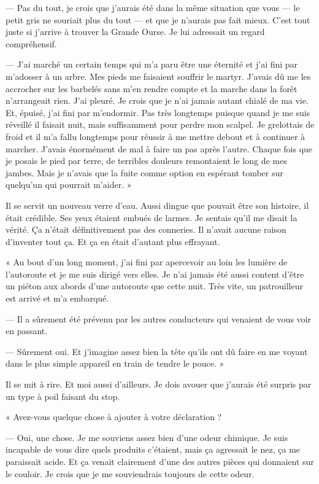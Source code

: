 — Pas du tout, je crois que j'aurais été dans la même situation que vous — le petit gris ne souriait plus du tout — et
que je n'aurais pas fait mieux. C'est tout juste si j'arrive à trouver la Grande Ourse. Je lui adressait un regard
compréhensif.

— J'ai marché un certain temps qui m'a paru être une éternité et j'ai fini par m'adosser à un arbre. Mes pieds me
faisaient souffrir le martyr. J'avais dû me les accrocher sur les barbelés sans m'en rendre compte et la marche dans la
forêt n'arrangeait rien. J'ai pleuré. Je crois que je n'ai jamais autant chialé de ma vie. Et, épuisé, j'ai fini par
m'endormir. Pas très longtemps puisque quand je me suis réveillé il faisait nuit, mais suffisamment pour perdre mon
scalpel. Je grelottais de froid et il m'a fallu longtemps pour réussir à me mettre debout et à continuer à marcher.
J'avais énormément de mal à faire un pas après l'autre. Chaque fois que je posais le pied par terre, de terribles
douleurs remontaient le long de mes jambes. Mais je n'avais que la fuite comme option en espérant tomber sur quelqu'un
qui pourrait m'aider. »

Il se servit un nouveau verre d'eau. Aussi dingue que pouvait être son histoire, il était crédible. Ses yeux étaient
embués de larmes. Je sentais qu'il me disait la vérité. Ça n'était définitivement pas des conneries. Il n'avait aucune
raison d'inventer tout ça. Et ça en était d'autant plus effrayant.

« Au bout d'un long moment, j'ai fini par apercevoir au loin les lumière de l'autoroute et je me suis dirigé vers elles.
Je n'ai jamais été aussi content d'être un piéton aux abords d'une autoroute que cette nuit. Très vite, un patrouilleur
est arrivé et m'a embarqué.

— Il a sûrement été prévenu par les autres conducteurs qui venaient de vous voir en passant.

— Sûrement oui. Et j'imagine assez bien la tête qu'ils ont dû faire en me voyant dans le plus simple appareil en train
de tendre le pouce. »

Il se mit à rire. Et moi aussi d'ailleurs. Je dois avouer que j'aurais été surpris par un type à poil faisant du stop.

« Avez-vous quelque chose à ajouter à votre déclaration ?

— Oui, une chose. Je me souviens assez bien d'une odeur chimique. Je suis incapable de vous dire quels produits
c'étaient, mais ça agressait le nez, ça me paraissait acide. Et ça venait clairement d'une des autres pièces qui
donnaient sur le couloir. Je crois que je me souviendrais toujours de cette odeur.

